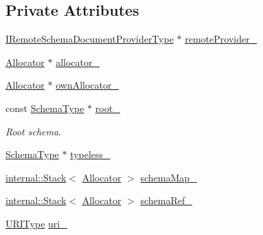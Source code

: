 \subsection*{Private Attributes}
\begin{DoxyCompactItemize}
\item 
\mbox{\hyperlink{classrapidjson_1_1_generic_schema_document_ab2764f2258889b3262eff6293d7ca015}{I\+Remote\+Schema\+Document\+Provider\+Type}} $\ast$ \mbox{\hyperlink{classrapidjson_1_1_generic_schema_document_a34513d08173e3499f3b6b906fdb7ce6a}{remote\+Provider\+\_\+}}
\item 
\mbox{\hyperlink{classrapidjson_1_1_allocator}{Allocator}} $\ast$ \mbox{\hyperlink{classrapidjson_1_1_generic_schema_document_a2e08550dc68553144a6d8d1cdde89011}{allocator\+\_\+}}
\item 
\mbox{\hyperlink{classrapidjson_1_1_allocator}{Allocator}} $\ast$ \mbox{\hyperlink{classrapidjson_1_1_generic_schema_document_a80844d6a0da89d38527883cbb19dfdac}{own\+Allocator\+\_\+}}
\item 
const \mbox{\hyperlink{classrapidjson_1_1_generic_schema_document_aaf4e7f371de938025f7ed4be3b83266e}{Schema\+Type}} $\ast$ \mbox{\hyperlink{classrapidjson_1_1_generic_schema_document_adb44efaa5ed363c73554de82958b4281}{root\+\_\+}}
\begin{DoxyCompactList}\small\item\em Root schema. \end{DoxyCompactList}\item 
\mbox{\hyperlink{classrapidjson_1_1_generic_schema_document_aaf4e7f371de938025f7ed4be3b83266e}{Schema\+Type}} $\ast$ \mbox{\hyperlink{classrapidjson_1_1_generic_schema_document_afb1ea66bb78ed9da2285c0b946d6d181}{typeless\+\_\+}}
\item 
\mbox{\hyperlink{classrapidjson_1_1internal_1_1_stack}{internal\+::\+Stack}}$<$ \mbox{\hyperlink{classrapidjson_1_1_allocator}{Allocator}} $>$ \mbox{\hyperlink{classrapidjson_1_1_generic_schema_document_adb08443004b8a6978bad470f2c32f998}{schema\+Map\+\_\+}}
\item 
\mbox{\hyperlink{classrapidjson_1_1internal_1_1_stack}{internal\+::\+Stack}}$<$ \mbox{\hyperlink{classrapidjson_1_1_allocator}{Allocator}} $>$ \mbox{\hyperlink{classrapidjson_1_1_generic_schema_document_ad85e2cdeb3cd92a19a4a9ac49fa24496}{schema\+Ref\+\_\+}}
\item 
\mbox{\hyperlink{classrapidjson_1_1_generic_schema_document_a72e8240701d707953bfd806cddc995b6}{U\+R\+I\+Type}} \mbox{\hyperlink{classrapidjson_1_1_generic_schema_document_a5d27a5ae1ddf4ffd702269654168f826}{uri\+\_\+}}
\end{DoxyCompactItemize}
